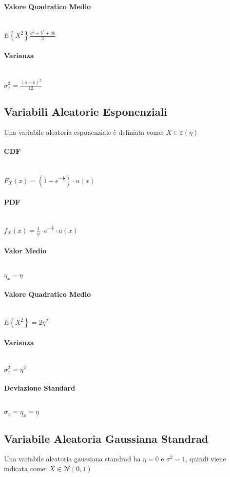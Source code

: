 \documentclass{article}
\begin{document}
\paragraph{Valore Quadratico Medio} ~\\
$E \left\{ X^2 \right\} \frac{a^2+b^2+ab}{3}$
\paragraph{Varianza} ~\\
$\sigma_x^2 = \frac{(a-b)^2}{12}$

\subsection{Variabili Aleatorie Esponenziali}
Una variabile aleatoria esponenziale è definiata come: $X \in \varepsilon \left( \eta \right)$ 
\paragraph{CDF} ~\\
$F_X(x) = \left( 1 - e^{- \frac x \eta } \right) \cdot u(x)
$
\paragraph{PDF} ~\\
$f_X(x) = \frac 1 \eta \cdot e^{-\frac x \eta} \cdot u(x)
$
\paragraph{Valor Medio} ~\\
$\eta_x = \eta$
\paragraph{Valore Quadratico Medio} ~\\
$E \left\{ X^2 \right\} = 2 \eta^2$
\paragraph{Varianza} ~\\
$\sigma_x^2 = \eta^2$
\paragraph{Deviazione Standard} ~\\
$\sigma_x = \eta_x = \eta $

\subsection{Variabile Aleatoria Gaussiana Standrad}
Una variabile aleatoria gaussiana standrad ha $\eta = 0 $ e $\sigma^2 = 1$, quindi viene indicata come: $X \in \mathcal{N}(0, 1)$
\end{document}
